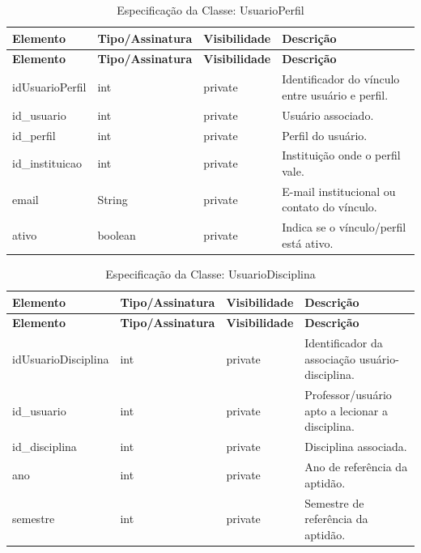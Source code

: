 \Needspace{0.32\textheight}
\begin{longtable}{|L{3.5cm}|L{3.5cm}|L{3.5cm}|L{3.5cm}|}
\caption{Especificação da Classe: UsuarioPerfil} \\
\hline
\textbf{Elemento} & \textbf{Tipo/Assinatura} & \textbf{Visibilidade} & \textbf{Descrição} \\
\hline
\endfirsthead
\hline
\textbf{Elemento} & \textbf{Tipo/Assinatura} & \textbf{Visibilidade} & \textbf{Descrição} \\
\hline
\endhead
idUsuarioPerfil & int & private & Identificador do vínculo entre usuário e perfil. \\
\hline
id\_usuario & int & private & Usuário associado. \\
\hline
id\_perfil & int & private & Perfil do usuário. \\
\hline
id\_instituicao & int & private & Instituição onde o perfil vale. \\
\hline
email & String & private & E-mail institucional ou contato do vínculo. \\
\hline
ativo & boolean & private & Indica se o vínculo/perfil está ativo. \\
\hline
\end{longtable}

\fonteautores

\vspace{\baselineskip}

\Needspace{0.32\textheight}
\begin{longtable}{|L{3.5cm}|L{3.5cm}|L{3.5cm}|L{3.5cm}|}
\caption{Especificação da Classe: UsuarioDisciplina} \\
\hline
\textbf{Elemento} & \textbf{Tipo/Assinatura} & \textbf{Visibilidade} & \textbf{Descrição} \\
\hline
\endfirsthead
\hline
\textbf{Elemento} & \textbf{Tipo/Assinatura} & \textbf{Visibilidade} & \textbf{Descrição} \\
\hline
\endhead
idUsuarioDisciplina & int & private & Identificador da associação usuário-disciplina. \\
\hline
id\_usuario & int & private & Professor/usuário apto a lecionar a disciplina. \\
\hline
id\_disciplina & int & private & Disciplina associada. \\
\hline
ano & int & private & Ano de referência da aptidão. \\
\hline
semestre & int & private & Semestre de referência da aptidão. \\
\hline
\end{longtable}

